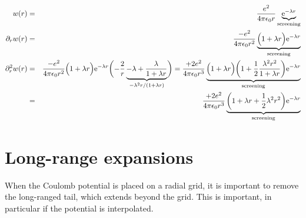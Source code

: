 \documentclass[11pt,a4paper]{report}
\begin{document}
\begin{eqnarray}
w(r)&=&\frac{e^2}{4\pi\epsilon_0r}
\underbrace{\mathrm{e}^{-\lambda r}}_{\text{screening}}
\nonumber\\
\partial_rw(r)&=&
\frac{-e^2}{4\pi\epsilon_0 r^2}
\underbrace{
\Bigl(1+\lambda r\Bigr)\mathrm{e}^{-\lambda r}
}_{\text{screening}}
\nonumber\\
\partial^2_rw(r)
&=&
\frac{-e^2}{4\pi\epsilon_0 r^2}
\Bigl(1+\lambda r\Bigr)\mathrm{e}^{-\lambda r}
\biggl(-\frac{2}{r}
\underbrace{
-\lambda+\frac{\lambda}{1+\lambda r}
}_{-\lambda^2r/(1+\lambda r)}
\biggr)
=\frac{+2e^2}{4\pi\epsilon_0 r^3}
\underbrace{
\Bigl(1+\lambda r\Bigr)
\biggl(1+\frac{1}{2}\frac{\lambda^2r^2}{1+\lambda r}\biggr)
\mathrm{e}^{-\lambda r}
}_{\text{screening}}
\nonumber\\
&=&
\frac{+2e^2}{4\pi\epsilon_0 r^3}
\underbrace{
\biggl(1+\lambda r+\frac{1}{2}\lambda^2r^2\biggr)
\mathrm{e}^{-\lambda r}
}_{\text{screening}}
\end{eqnarray}




\section{Long-range expansions}
When the Coulomb potential is placed on a radial grid, it is important
to remove the long-ranged tail, which extends beyond the grid.  This
is important, in particular if the potential is interpolated.

\end{document}
